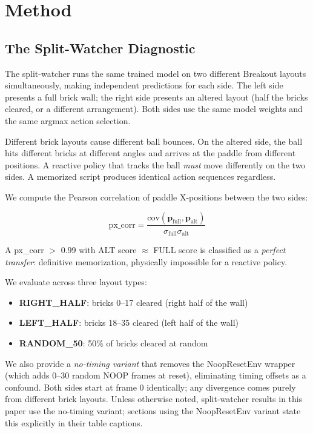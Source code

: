 \documentclass[11pt]{article}
\begin{document}
\section{Method}

\subsection{The Split-Watcher Diagnostic}

The split-watcher runs the same trained model on two different Breakout layouts
simultaneously, making independent predictions for each side. The left side
presents a full brick wall; the right side presents an altered layout (half
the bricks cleared, or a different arrangement). Both sides use the same model
weights and the same argmax action selection.

Different brick layouts cause different ball
bounces. On the altered side, the ball hits different bricks at different
angles and arrives at the paddle from different positions. A reactive policy
that tracks the ball \emph{must} move differently on the two sides. A memorized
script produces identical action sequences regardless.

We compute the Pearson correlation of paddle X-positions between the two sides:

\begin{equation}
    \text{px\_corr} = \frac{\text{cov}(\mathbf{p}_{\text{full}},
    \mathbf{p}_{\text{alt}})}
    {\sigma_{\text{full}} \sigma_{\text{alt}}}
\end{equation}

A px\_corr $>$ 0.99 with ALT score $\approx$ FULL score is classified as a
\emph{perfect transfer}: definitive memorization, physically impossible for a
reactive policy.

We evaluate across three layout types:
\begin{itemize}
    \item \textbf{RIGHT\_HALF}: bricks 0--17 cleared (right half of the wall)
    \item \textbf{LEFT\_HALF}: bricks 18--35 cleared (left half of the wall)
    \item \textbf{RANDOM\_50}: 50\% of bricks cleared at random
\end{itemize}

We also provide a \emph{no-timing variant} that removes the NoopResetEnv
wrapper (which adds 0--30 random NOOP frames at reset), eliminating timing
offsets as a confound. Both sides start at frame 0 identically; any divergence
comes purely from different brick layouts. Unless otherwise noted, split-watcher
results in this paper use the no-timing variant; sections using the
NoopResetEnv variant state this explicitly in their table captions.
\end{document}
